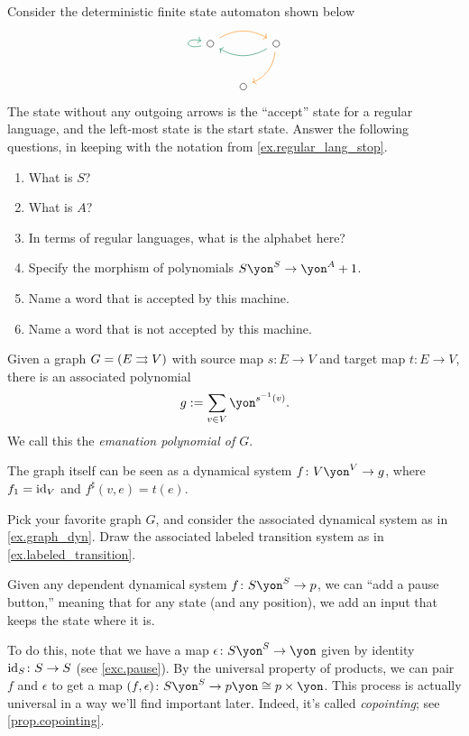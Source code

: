 \documentclass[Book-Poly]{subfiles}
\begin{document}
\begin{exercise}\label{exc.det_fsa_misc_398}
Consider the deterministic finite state automaton shown below
\[
\begin{tikzcd}[column sep=small]
	\LMO{}\ar[rr, bend left, orange]\ar[loop left, dgreen]&&
	\LMO{}\ar[dl, bend left, orange]\ar[ll, dgreen, bend left]\\&
	\LMO{}
\end{tikzcd}
\]
The state without any outgoing arrows is the ``accept'' state for a regular language, and the left-most state is the start state. Answer the following questions, in keeping with the notation from \cref{ex.regular_lang_stop}.

\begin{enumerate}
	\item What is $S$?
	\item What is $A$?
	\item In terms of regular languages, what is the alphabet here?
	\item Specify the morphism of polynomials $S\yon^S\to\yon^A+1$.
	\item Name a word that is accepted by this machine.
	\item Name a word that is not accepted by this machine.
\qedhere
\end{enumerate}
\end{exercise}

\begin{example}[Graphs] \label{ex.graph_dyn}
Given a graph $G = (E \rightrightarrows V)$ with source map $s \colon E \to V$ and target map $t \colon E \to V$, there is an associated polynomial
\[
    g := \sum_{v \in V} \yon^{s\inv(v)}.
\]
We call this the \emph{emanation polynomial of $G$}.

The graph itself can be seen as a dynamical system $f \colon V\yon^V \to g$, where $f_1 = \mathrm{id}_V$ and $f^\sharp(v, e) = t(e)$.
\end{example}

\begin{exercise}
Pick your favorite graph $G$, and consider the associated dynamical system as in \cref{ex.graph_dyn}.
Draw the associated labeled transition system as in \cref{ex.labeled_transition}.
\end{exercise}

\begin{example}\label{ex.pause}
Given any dependent dynamical system $f\colon S\yon^S\to p$, we can ``add a pause button,'' meaning that for any state (and any position), we add an input that keeps the state where it is.

To do this, note that we have a map $\epsilon\colon S\yon^S\to\yon$ given by identity $\mathrm{id}_S\colon S\to S$ (see \cref{exc.pause}). By the universal property of products, we can pair $f$ and $\epsilon$ to get a map $(f,\epsilon)\colon S\yon^S\to p\yon\cong p\times \yon$. This process is actually universal in a way we'll find important later. Indeed, it's called \emph{copointing}; see \cref{prop.copointing}.
\end{example}
\end{document}
